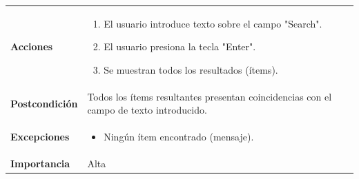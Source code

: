 \documentclass[
]{article}
\providecommand{\tightlist}{%
  \setlength{\itemsep}{0pt}\setlength{\parskip}{0pt}}
\begin{document}
\begin{longtable}[]{@{}ll@{}}
\begin{minipage}[t]{0.21\columnwidth}
\textbf{Acciones}\strut
\end{minipage} & \begin{minipage}[t]{0.73\columnwidth}\raggedright
\begin{enumerate}
\def\labelenumi{\arabic{enumi}.}
\tightlist
\item
  El usuario introduce texto sobre el campo "Search".
\item
  El usuario presiona la tecla "Enter".
\item
  Se muestran todos los resultados (ítems).
\end{enumerate}\strut
\end{minipage}\tabularnewline
\begin{minipage}[t]{0.21\columnwidth}\raggedright
\textbf{Postcondición}\strut
\end{minipage} & \begin{minipage}[t]{0.73\columnwidth}\raggedright
Todos los ítems resultantes presentan coincidencias con el campo de
texto introducido.\strut
\end{minipage}\tabularnewline
\begin{minipage}[t]{0.21\columnwidth}\raggedright
\textbf{Excepciones}\strut
\end{minipage} & \begin{minipage}[t]{0.73\columnwidth}\raggedright
\begin{itemize}
\tightlist
\item
  Ningún ítem encontrado (mensaje).
\end{itemize}\strut
\end{minipage}\tabularnewline
\begin{minipage}[t]{0.21\columnwidth}\raggedright
\textbf{Importancia}\strut
\end{minipage} & \begin{minipage}[t]{0.73\columnwidth}\raggedright
Alta\strut
\end{minipage}\tabularnewline
\bottomrule
\end{longtable}
\end{document}
